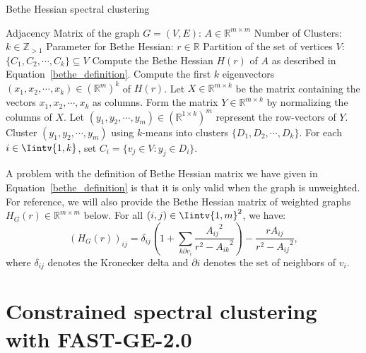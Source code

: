 \begin{algorithm}
\caption{Bethe Hessian spectral clustering}\label{bethe_clustering}
\begin{algorithmic}[1]
   \Require 
      \Statex Adjacency Matrix of the graph $G = (V,E)$: $A \in \mathbb R ^ {m \times m}$ 
      \Statex Number of Clusters: $k \in \mathbb Z_{>1}$
      \Statex Parameter for Bethe Hessian: $r \in \mathbb R$
   \Ensure 
      \Statex Partition of the set of vertices $V$: $\{ C_1, C_2, \cdots, C_k \} \subseteq V$
      \vspace{0.2 cm}
   \State Compute the Bethe Hessian $H(r)$ of $A$ as described in Equation~\vref{bethe_definition}.
   \State Compute the first $k$ eigenvectors $(x_1, x_2, \cdots, x_k) \in (\mathbb R^{m})^k$ of $H(r)$.
   \State Let $X \in \mathbb R^{m \times k}$ be the matrix containing the vectors $x_1, x_2, \cdots, x_k$ as columns.
   \State Form the matrix $Y \in \mathbb R^{m \times k}$ by normalizing the columns of $X$.
   \State Let $(y_1, y_2, \cdots, y_m) \in ( \mathbb R^{1 \times k} )^m$ represent the row-vectors of $Y$.
   \State Cluster $(y_1, y_2, \cdots, y_m)$ using $k$-means into clusters $\{ D_1, D_2, \cdots, D_k \} $.
   \State For each $i \in \Iintv{1,k}$, set $C_i = \{ v_j \in V: y_j \in D_i \}$.
\end{algorithmic}
\end{algorithm}


A problem with the definition of Bethe Hessian matrix we have given in Equation~\vref{bethe_definition} is that it is only valid when the graph is unweighted.
For reference, we will also provide the Bethe Hessian matrix of weighted graphs $H_G(r) \in \mathbb R^{m \times m}$ below. For all $(i,j) \in \Iintv{1,m}^2$, we have:
\begin{equation}
   \left( H_G(r) \right)_{ij} = \delta _{ij} \left( 1 + \sum _{k \partial v_i}\frac{{A_{ij}}^2}{r^2 - {A_{ik}}^2} \right) - \frac{r A_{ij}}{r^2 - {A_{ij}}^2},
\end{equation}
where $\delta_{ij}$ denotes the Kronecker delta and $\partial i$ denotes the set of neighbors of $v_i$.



\chapter{Constrained spectral clustering with FAST-GE-2.0}\label{fastge2chapter}

